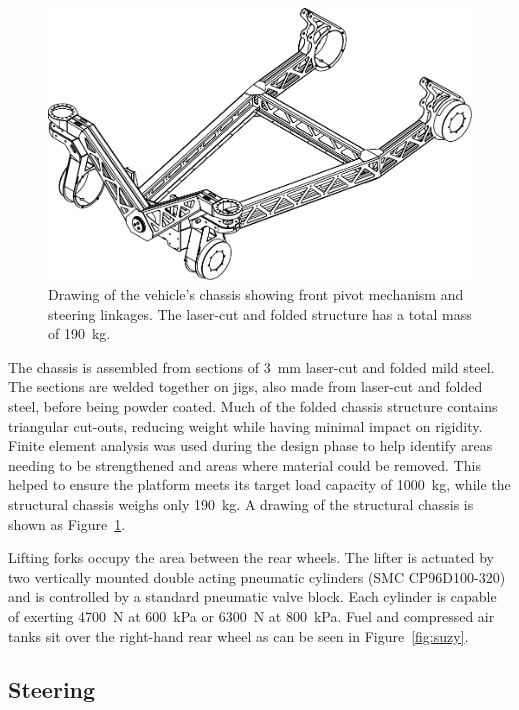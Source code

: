 \documentclass[preprint,authoryear,12pt]{elsarticle}
\begin{document}
        \begin{figure}[htb]
            \centering
            \includegraphics[width=0.6\linewidth]{imgs/profile_views/AMMP-Chassis-1-20.pdf}
            \caption{Drawing of the vehicle's chassis showing front pivot mechanism and steering linkages. The laser-cut and folded structure has a total mass of \SI{190}{\kilo\gram}.}
            \label{fig:AMMPChassis}
        \end{figure}

        The chassis is assembled from sections of \SI{3}{\milli\meter} laser-cut and folded mild steel.
        The sections are welded together on jigs, also made from laser-cut and folded steel, before being powder coated.
        Much of the folded chassis structure contains triangular cut-outs, reducing weight while having minimal impact on rigidity.
        Finite element analysis was used during the design phase to help identify areas needing to be strengthened and areas where material could be removed.
        This helped to ensure the platform meets its target load capacity of \SI{1000}{\kilo\gram}, while the structural chassis weighs only \SI{190}{\kilo\gram}.
        A drawing of the structural chassis is shown as Figure~\ref{fig:AMMPChassis}.

        Lifting forks occupy the area between the rear wheels.
        The lifter is actuated by two vertically mounted double acting pneumatic cylinders (SMC CP96D100-320) and is controlled by a standard pneumatic valve block.
        Each cylinder is capable of exerting \SI{4700}{\newton} at \SI{600}{\kilo\pascal} or \SI{6300}{\newton} at \SI{800}{\kilo\pascal}.
        Fuel and compressed air tanks sit over the right-hand rear wheel as can be seen in Figure~\ref{fig:suzy}.

    \subsection{Steering}
    \label{sub:steering}
\end{document}
